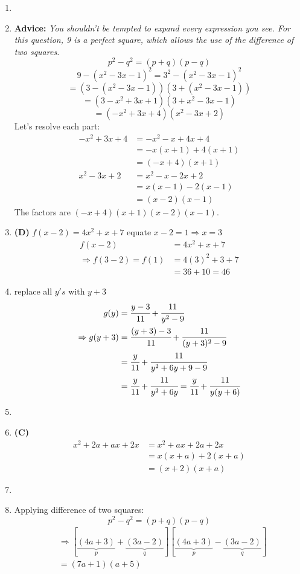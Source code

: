 \begin{multicols}{2}
\begin{enumerate}[label={\textbf{\arabic*.}}]
    \item
    \item \textbf{Advice:} \textit{You shouldn't be tempted to expand every expression you see. For this question, 9 is a perfect square, which allows the use of the difference of two squares.}
    \[\boxed{p^2 - q^2 = (p + q)(p - q)}\]
    \[ 9 - (x^2 - 3x - 1)^2 = 3^2 - (x^2 - 3x - 1)^2\]  
    \[ = (3 - (x^2 - 3x - 1))(3 + (x^2 - 3x - 1))\]
    \[ = (3 - x^2 + 3x + 1)(3 + x^2 - 3x - 1) \]
    \[= (-x^2 + 3x + 4)(x^2 - 3x + 2)\]
    Let's resolve each part:
    \begin{align*}
    -x^2 + 3x + 4 &= -x^2 - x + 4x + 4 \\
    &= -x(x + 1) + 4(x + 1) \\
    &= (-x + 4)(x + 1)\\
    x^2 - 3x + 2 &= x^2 - x - 2x + 2 \\
    &= x(x - 1) - 2(x - 1) \\
    &= (x - 2)(x - 1)
    \end{align*}
    The factors are \((-x + 4)(x + 1)(x - 2)(x - 1)\).

    \item \textbf{(D)} $f(x - 2) = 4x^2 + x + 7 $ equate $x - 2 = 1 \Rightarrow x = 3$ 
    \begin{align*} 
        f(x - 2) &= 4x^2 + x + 7 \\
        \Rightarrow  f(3 - 2) = f(1) &= 4(3)^2 + 3 + 7 \\
        & = 36 + 10 = 46
    \end{align*}

    \item replace all $y's \text { with } y + 3  $ 
    \begin{align*} 
        g(y) &= \cfrac{y - 3}{11} + \cfrac{11}{y^2 - 9} \\
       \Rightarrow  g(y + 3) &= \cfrac{(y + 3) - 3}{11} + \cfrac{11}{(y + 3)^2 - 9}  \\
        & = \cfrac{y}{11} + \cfrac{11}{y^2 + 6y + 9 -9} \\
        & = \cfrac{y}{11} + \cfrac{11}{y^2 + 6y} = \cfrac{y}{11} + \cfrac{11}{y (y + 6 ) }
    \end{align*}
\item 
\item \textbf{(C)}
    \begin{align*} 
        x^2 + 2a + ax + 2x &= x^2 + ax + 2a + 2x \\
        &= x(x + a) + 2(x + a) \\
        &= (x + 2)(x + a)
    \end{align*}
    \item 
\item Applying difference of two squares: \[p^2 - q^2 = (p + q)(p - q)\]
        \begin{align*}
            &\Rightarrow [\underbrace{(4a + 3)}_{p} + \underbrace{(3a - 2)}_{q}][\underbrace{(4a + 3)}_{p} - \underbrace{(3a - 2)}_{q}] \\
            &= (7a + 1)(a + 5)
        \end{align*}
    

\end{enumerate}
\end{multicols}
